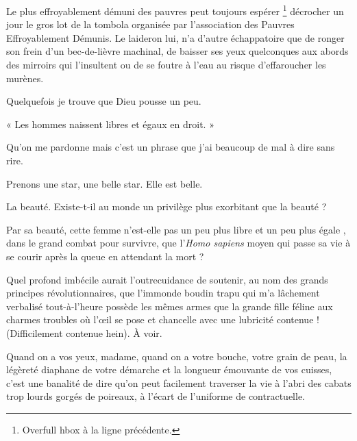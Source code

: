 \documentclass[french,twoside]{article}
\begin{document}
Le plus effroyablement démuni des pauvres peut toujours espérer
\footnote{Overfull hbox  à la ligne précédente.}
décrocher un jour le gros lot de la tombola organisée par
l’association des Pauvres Effroyablement Démunis.
%
Le laideron lui, n’a d’autre échappatoire que de
ronger son frein d’un bec-de-lièvre machinal, de baisser ses yeux quelconques
aux abords des mirroirs qui l’insultent ou de se foutre à l’eau au risque
d’effaroucher les murènes.

Quelquefois je trouve que Dieu pousse un peu.

« Les hommes naissent libres et égaux en droit. »

Qu’on me pardonne mais c’est un phrase que j’ai beaucoup de mal à dire sans
rire. %

Prenons une star, une belle star. Elle est belle.

La beauté. Existe-t-il au monde un privilège plus exorbitant que la beauté ?

Par sa beauté, cette femme n’est-elle pas un peu plus libre
et un peu plus égale , dans le grand combat pour survivre,
que l’\textit{Homo sapiens} moyen qui passe sa vie à se courir
après la queue en attendant la mort ?

Quel profond imbécile aurait l’outrecuidance de soutenir, au nom des grands
principes révolutionnaires, que l’immonde boudin trapu qui m’a
lâchement verbalisé
tout-à-l’heure
possède les mêmes armes
que la grande fille féline aux charmes troubles où l’œil se
pose et chancelle avec une lubricité contenue !
(Difficilement contenue hein). À voir.

Quand on a vos yeux, madame, quand on a votre bouche, votre grain de peau, la
légèreté diaphane de votre démarche et la longueur émouvante de vos cuisses,
c’est une banalité de dire qu’on peut facilement traverser la vie %
à l’abri des cabats trop lourds gorgés de poireaux, à l’écart de l’uniforme de
contractuelle.
\end{document}
